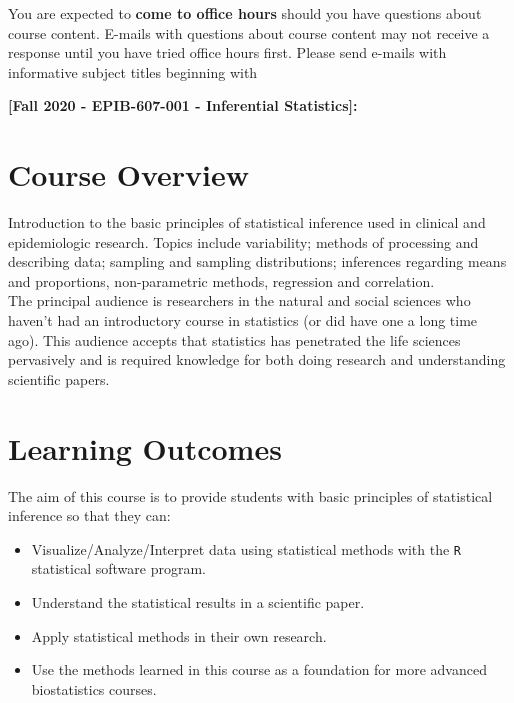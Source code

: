 \documentclass[]{article}
\begin{document}
You are expected to \textbf{come to office hours} should you have questions about course content. E-mails with questions about course content may not receive a response until you have tried office hours first. Please send e-mails with informative subject titles beginning with 
\begin{center}
	\textbf{[Fall 2020 - EPIB-607-001 - Inferential Statistics]: }
\end{center}




\section{Course Overview}
Introduction to the basic principles of statistical inference used in clinical and epidemiologic research. Topics include variability; methods of processing and describing data; sampling and sampling distributions; inferences regarding means and proportions, non-parametric methods, regression and correlation. \\

The principal audience is researchers in the natural and social sciences who haven't had an introductory course in statistics (or did have one a long time ago). This audience accepts that statistics has penetrated the life sciences pervasively and is required knowledge for both doing research and understanding scientific papers.

\section{Learning Outcomes}
The aim of this course is to provide students with basic principles of statistical inference so that they can:

\begin{itemize}
\item Visualize/Analyze/Interpret data using statistical methods with the \texttt{R} statistical software program.
\item Understand the statistical results in a scientific paper.
\item Apply statistical methods in their own research.
\item Use the methods learned in this course as a foundation for more advanced biostatistics courses.
\end{itemize}
\end{document}
